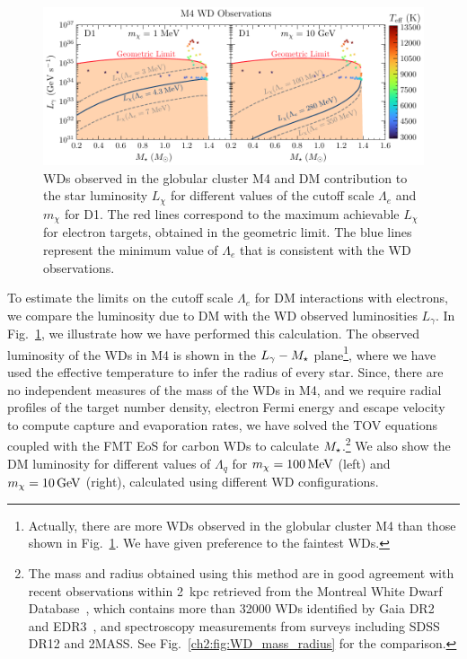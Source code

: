 \begin{figure}[t!bp]
    \centering
    \includegraphics[width=\textwidth]{wd_capture/Lum_WDmass_M4.pdf}
    \caption{WDs observed in the globular cluster M4 and DM contribution to the star luminosity $L_\chi$ for different values of the cutoff scale $\Lambda_e$ and $m_\chi$ for D1. The red lines correspond to the maximum achievable $L_\chi$ for electron targets, obtained in the geometric limit. The blue lines represent the minimum value of $\Lambda_e$ that is consistent with the WD observations. }
    \label{ch4:fig:limitset}
\end{figure}


To estimate the limits on the cutoff scale $\Lambda_e$ for DM interactions with electrons, we compare the luminosity due to DM  with the WD observed luminosities $L_\gamma$. In Fig.~\ref{ch4:fig:limitset}, we illustrate how we have performed this calculation.
The observed luminosity of the WDs in M4 is shown in the $L_\gamma-M_\star$ plane\footnote{Actually, there are more WDs observed in the globular cluster M4 than those shown in Fig.~\ref{ch4:fig:limitset}. We have given preference to the faintest WDs.}, where we have used the effective temperature to infer the radius of every star. Since, there are no independent measures of the mass of the WDs in M4, and we require radial profiles of the target number density, electron Fermi energy and escape velocity to compute capture and evaporation rates, we have solved the TOV equations coupled with the FMT EoS for carbon WDs to calculate $M_\star$.\footnote{The mass and radius obtained using this method are in good agreement with recent observations within 2~kpc retrieved from the Montreal White Dwarf Database~\cite{Dufour_mar_Montrealwhitedwarf}, which contains more than 32000 WDs identified by Gaia DR2~\cite{Torres_feb_GaiaDR2halo} and EDR3~\cite{Gaia:2020wqu_may_Gaiaearlydata}, and spectroscopy measurements from surveys including SDSS DR12 and 2MASS. See Fig.~\ref{ch2:fig:WD_mass_radius} for the comparison.}  We also show the DM luminosity for different values of $\Lambda_q$ for $m_\chi=100{\rm \,MeV}$ (left) and $m_\chi=10{\rm \,GeV}$ (right), calculated using different WD configurations. 

